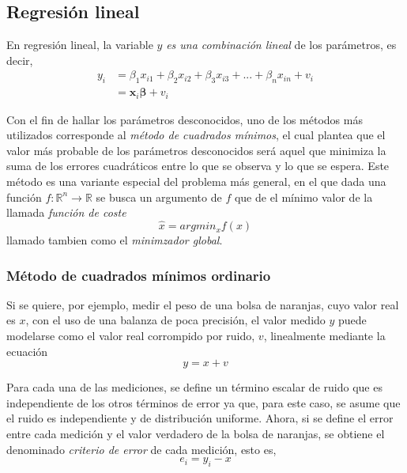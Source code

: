 \subsection{Regresión lineal}
En regresión lineal, la variable $y$ \textit{es una combinación lineal} de los parámetros, es decir,
\begin{align}
    y_i &= \beta_1 x_{i1} + \beta_2 x_{i2} + \beta_3 x_{i3} + ... + \beta_n x_{in} + v_i \\
      &= \bm{x}_i \bm{\beta} + v_i
\end{align}

Con el fin de hallar los parámetros desconocidos, uno de los métodos más utilizados corresponde al \textit{método de cuadrados mínimos}, el cual plantea que el valor más probable de los parámetros desconocidos será aquel que minimiza la suma de los errores cuadráticos entre lo que se observa y lo que se espera. Este método es una variante especial del problema más general, en el que dada una función $f:\mathbb{R}^n\rightarrow\mathbb{R}$ se busca un argumento de $f$ que de el mínimo valor de la llamada \textit{función de coste}
\begin{equation}
    \hat{x} = argmin_x f(x)
    \label{eq:globalminimizer}
\end{equation}
llamado tambien como el \textit{minimzador global}.

\subsubsection{Método de cuadrados mínimos ordinario}
Si se quiere, por ejemplo, medir el peso de una bolsa de naranjas, cuyo valor real es $x$, con el uso de una balanza de poca precisión, el valor medido $y$ puede modelarse como el valor real corrompido por ruido, $v$, linealmente mediante la ecuación
\begin{equation}
    y = x + v
    \label{eq:linearmeasmodel}
\end{equation}

Para cada una de las mediciones, se define un término escalar de ruido que es independiente de los otros términos de error ya que, para este caso, se asume que el ruido es independiente y de distribución uniforme. Ahora, si se define el error entre cada medición y el valor verdadero de la bolsa de naranjas, se obtiene el denominado \textit{criterio de error} de cada medición, esto es,
\begin{equation}
    e_i = y_i - x
\end{equation}

